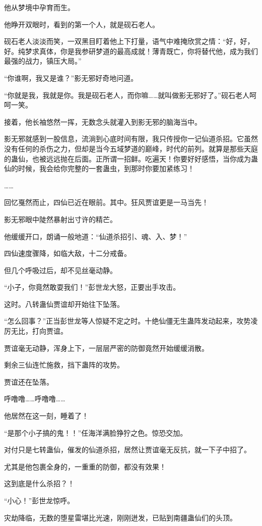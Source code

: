 \begin{this_body}
他从梦境中孕育而生。

他睁开双眼时，看到的第一个人，就是砚石老人。

砚石老人淡淡而笑，一双黑目盯着他上下打量，语气中难掩欣赏之情：“好，好，好。纯梦求真体，你是我参研梦道的最高成就！薄青既亡，你将替代他，成为我们最强的战力，镇压大局。”

“你谁啊，我又是谁？”影无邪好奇地问道。

“你就是我，我就是你。我是砚石老人，而你嘛……就叫做影无邪好了。”砚石老人呵呵一笑。

接着，他长袖悠然一挥，无数念头就灌入到影无邪的脑海当中。

影无邪就感到一股信息，流淌到心底时间有限，我只传授你一记仙道杀招。它虽然没有任何的杀伤之力，但却是当今五域梦道的巅峰，时代的前列。就算是那些天庭的蛊仙，也被远远抛在后面。正所谓一招鲜。吃遍天！你要好好感悟，当你成为蛊仙的时候，我会给你完整的一套蛊虫，到那时你要加紧练习！

……

回忆戛然而止，四仙已近在眼前。其中。狂风贾谊更是一马当先！

影无邪眼中陡然暴射出寸许的精芒。

他缓缓开口，朗诵一般地道：“仙道杀招引、魂、入、梦！”

四仙速度骤降，如临大敌，十二分戒备。

但几个呼吸过后，却不见丝毫动静。

“小子，你竟然敢耍我们！”彭世龙大怒，正要出手攻击。

这时。八转蛊仙贾谊却开始往下坠落。

“怎么回事？”正当彭世龙等人惊疑不定之时。十绝仙僵无生蛊阵发动起来，攻势凌厉无比，打向贾谊。

贾谊毫无动静，浑身上下，一层层严密的防御竟然开始缓缓消散。

剩余三仙连忙施救，挡下蛊阵的攻势。

贾谊还在坠落。

呼噜噜……呼噜噜……

他居然在这一刻，睡着了！

“是那个小子搞的鬼！！”任海洋满脸狰狞之色。惊恐交加。

对付只是七转蛊仙，催发的仙道杀招，居然让贾谊毫无反抗，就一下子中招了。

尤其是他包裹全身的，一重重的防御，都没有效果！

这到底是什么杀招？！

“小心！”彭世龙惊呼。

灾劫降临，无数的堕星雷堪比光速，刚刚迸发，已贴到南疆蛊仙们的头顶。


\end{this_body}
